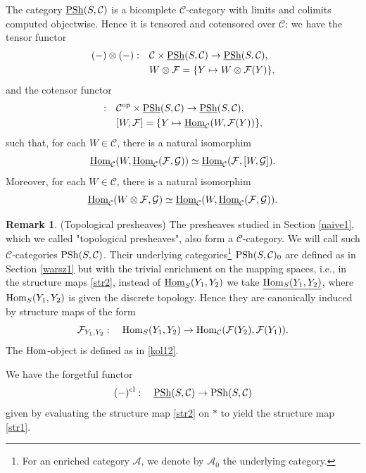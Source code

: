 \documentclass[10pt]{amsart}
\theoremstyle{definition}
\newtheorem{remark}[equation]{Remark}
\theoremstyle{remark}
\newcommand{\Hom}{{\rm{Hom}} }
\newcommand{\uHom}{\underline{{\rm{Hom}} }}
\newcommand{\sff}{{\mathcal{F}}}
\newcommand{\sg}{{\mathcal{G}}}
\newcommand{\scc}{{\mathcal{C}}}
\newcommand{\sa}{{\mathcal{A}}}
\numberwithin{equation}{section}
\numberwithin{equation}{section}
\begin{document}
   The  category $\underline{{\rm PSh}}(S,\scc)$ is a  bicomplete  $\scc$-category \cite[Sec. 3.3]{Kelly} with limits and colimits computed objectwise. Hence it is  tensored and cotensored over $\scc$:   we have the tensor functor
 \begin{align*}
  (-)\otimes (-):\quad  & \scc\times \underline{\rm PSh}(S,\scc)\to \underline{\rm PSh}(S,\scc),\\
   & W\otimes\sff=\{Y\mapsto W\otimes\sff(Y)\},
 \end{align*}
and  the cotensor functor
 \begin{align*}
 [-,-]:\quad  & \scc^{\rm op}\times \underline{\rm PSh}(S,\scc)\to \underline{\rm PSh}(S,\scc),\\
  & [W,\sff]=\{Y\mapsto \uHom_{\scc}(W,\sff(Y))\},
 \end{align*}
such that, for each $W\in \scc$, there is a natural isomorphim
 \begin{equation}\label{mor10}
 \uHom_{\scc}(W,\uHom_{\scc}(\sff,\sg))\simeq \uHom_{\scc}(\sff,[W,\sg]).
 \end{equation}
 Moreover,  for each $W\in \scc$, there is a natural isomorphim
 $$
 \uHom_{\scc}(W\otimes\sff,\sg)\simeq\uHom_{\scc}(W,\uHom_{\scc}(\sff,\sg)). 
 $$
  \begin{remark}{\rm (Topological presheaves)} \label{koczkodan1} The presheaves studied in Section \ref{naive1},  which we called "{topological presheaves}", also form a $\scc$-category. We will call  such $\scc$-categories $ {\rm PSh}(S,\scc)$. Their underlying categories\footnote{For an enriched category $\sa$, we denote by $\sa_0$ the underlying category.} ${\rm PSh}(S,\scc)_0$ are   defined as in Section \ref{warsz1}   but with the trivial enrichment on the mapping spaces, i.e., in the structure maps \eqref{str2}, instead of
$\uHom_S(Y_1,Y_2)$ we take $\underline{\Hom_S(Y_1,Y_2)}$, where $\Hom_S(Y_1,Y_2)$ is given the discrete topology. Hence they are canonically  induced by structure maps of the form
\begin{equation}\label{str1}
\sff_{Y_1, Y_2}:\quad \Hom_S(Y_1,Y_2)\to \Hom_{\scc}(\sff(Y_2),\sff(Y_1)).
\end{equation}
The $\Hom$-object is defined as in \eqref{kol12}. 
 
 We have the forgetful functor
$$
(-)^{\rm cl}: \quad  \underline{\rm PSh}(S,\scc)\to {\rm PSh}(S,\scc)
 $$
 given by evaluating the structure map \eqref{str2} on $*$ to yield the structure map \eqref{str1}.
\end{remark}
\end{document}
